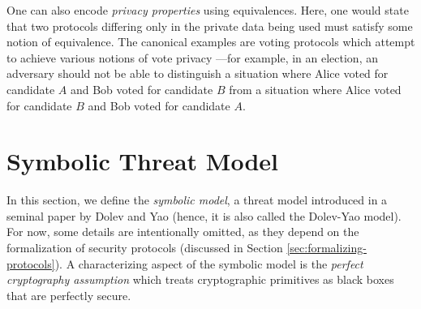 \documentclass{article}
\theoremstyle{definition}
\begin{document}
One can also encode \emph{privacy properties} using equivalences.  
Here, one would state that two protocols differing only in the private data being used must satisfy 
some notion of equivalence. The canonical examples are voting protocols which attempt to achieve 
various notions of vote privacy \cite{vote_privacy}---for example, in an election, 
an adversary should not be able to distinguish a situation where Alice voted for candidate $A$
and Bob voted for candidate $B$ from a situation where Alice voted for candidate $B$ and Bob voted for candidate $A$. 

\section{Symbolic Threat Model}\label{sec:sym-threat-model}
In this section, we define the \textit{symbolic model}, a threat model 
introduced in a seminal paper by Dolev and Yao \cite{dolev_yao} (hence, it is also called the Dolev-Yao model). 
For now, some details are intentionally omitted, as they depend on the formalization of security protocols 
(discussed in Section \ref{sec:formalizing-protocols}). 
A characterizing aspect of the symbolic model is the \textit{perfect cryptography assumption} 
which treats cryptographic primitives as black boxes that are perfectly secure.
\end{document}
